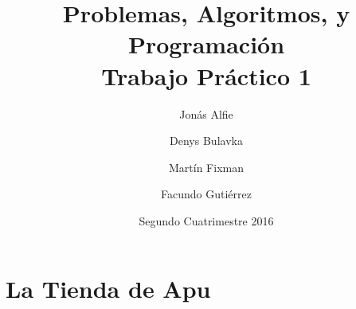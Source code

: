 \documentclass{article}
\title{Problemas, Algoritmos, y Programación \\ Trabajo Práctico 1}
\author{Jonás Alfie \and Denys Bulavka \and Martín Fixman \and Facundo Gutiérrez}
\date{Segundo Cuatrimestre 2016}
\begin{document}
\maketitle{}

\newpage{}

\section{La Tienda de Apu}


\end{document}
